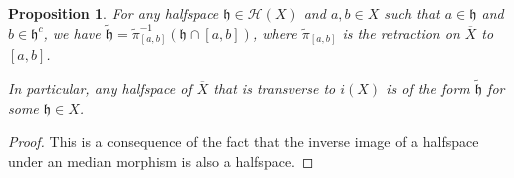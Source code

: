 \documentclass{amsart}
\numberwithin{equation}{section}
\newtheorem{prop}[thm]{Proposition}
\newcommand{\HH}{\mathcal{H}}     %
\newcommand{\hh}{\mathfrak{h}}    %
\theoremstyle{definition}
\def\bar{\overline}
\begin{document}
\begin{prop}\label{prop_description_halfspace_arising_from_X}
    For any halfspace $\hh\in \HH(X)$ and $a,b\in X$ such that $a\in \hh$ and $b\in \hh^c$, we have $\tilde{\hh}=\tilde{\pi}_{[a,b]}^{-1}(\hh\cap[a,b])$, where $\tilde{\pi}_{[a,b]}$ is the retraction on $\bar{X}$ to $[a,b]$.\par
    In particular, any halfspace of $\bar X$ that is transverse to $i(X)$ is of the form $\tilde{\hh}$ for some $\hh\in X$.
\end{prop} 

\begin{proof}
This is a consequence of the fact that the inverse image of a halfspace under an median morphism is also a halfspace. 
\end{proof}
\end{document}
